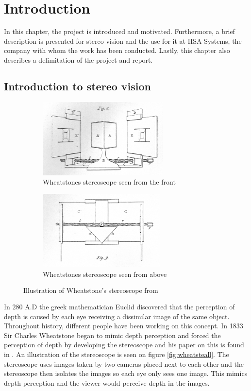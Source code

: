 \chapter{Introduction}\label{ch:introduction}
In this chapter, the project is introduced and motivated. Furthermore, a brief description is presented for stereo vision and the use for it at HSA Systems, the company with whom the work has been conducted. Lastly, this chapter also describes a delimitation of the project and report.\\

\section{Introduction to stereo vision}\label{sec:stereo vision}
\begin{figure}[ht!]
  \centering
  \begin{subfigure}[t]{0.45\textwidth}
    \centering\includegraphics[height=4cm]{figures/paper1-fig08}
    \caption{Wheatstones stereoscope seen from the front\label{fig:wheatstef}}
  \end{subfigure}\hspace{0.5cm}
  \begin{subfigure}[t]{0.45\textwidth}
    \centering\includegraphics[height=4cm]{figures/paper1-fig09}
    \caption{Wheatstones stereoscope seen from above\label{fig:wheatstet}}
  \end{subfigure}
  \caption{Illustration of Wheatstone's stereoscope from \cite{wheatstone1838contributions}\label{fig:wheatsteall}}
\end{figure}
In 280 A.D the greek mathematician Euclid discovered that the perception of depth is caused by each eye receiving a dissimilar image of the same object. Throughout history, different people have been working on this concept. In 1833 Sir Charles Wheatstone began to mimic depth perception and forced the perception of depth by developing the stereoscope and his paper on this is found in \cite{wheatstone1838contributions}. An illustration of the stereoscope is seen on figure \vref{fig:wheatsteall}. The stereoscope uses images taken by two cameras placed next to each other and the stereoscope then isolates the images so each eye only sees one image. This mimics depth perception and the viewer would perceive depth in the images. \cite{lit:historyofstereophoto}\\

